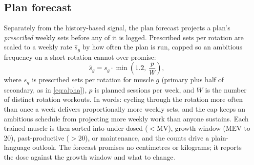\documentclass[11pt,a4paper]{article}
\newcommand{\MV}{\mathrm{MV}}
\newcommand{\MEV}{\mathrm{MEV}}
\begin{document}
\subsection{Plan forecast}\label{sec:plan}
Separately from the history-based signal, the plan forecast projects a plan's \emph{prescribed} weekly sets before any of it is logged. Prescribed sets per rotation are scaled to a weekly rate $\hat{s}_g$ by how often the plan is run, capped so an ambitious frequency on a short rotation cannot over-promise:
\begin{equation}\label{eq:plan}
\hat{s}_g = s_g \cdot \min\!\left(1.2,\ \frac{p}{W}\right),
\end{equation}
where $s_g$ is prescribed sets per rotation for muscle $g$ (primary plus half of secondary, as in \eqref{eq:alpha}), $p$ is planned sessions per week, and $W$ is the number of distinct rotation workouts. In words: cycling through the rotation more often than once a week delivers proportionally more weekly sets, and the cap keeps an ambitious schedule from projecting more weekly work than anyone sustains. Each trained muscle is then sorted into under-dosed ($<\MV$), growth window ($\MEV$ to 20), past-productive ($>20$), or maintenance, and the counts drive a plain-language outlook. The forecast promises no centimetres or kilograms; it reports the dose against the growth window and what to change.
\end{document}
